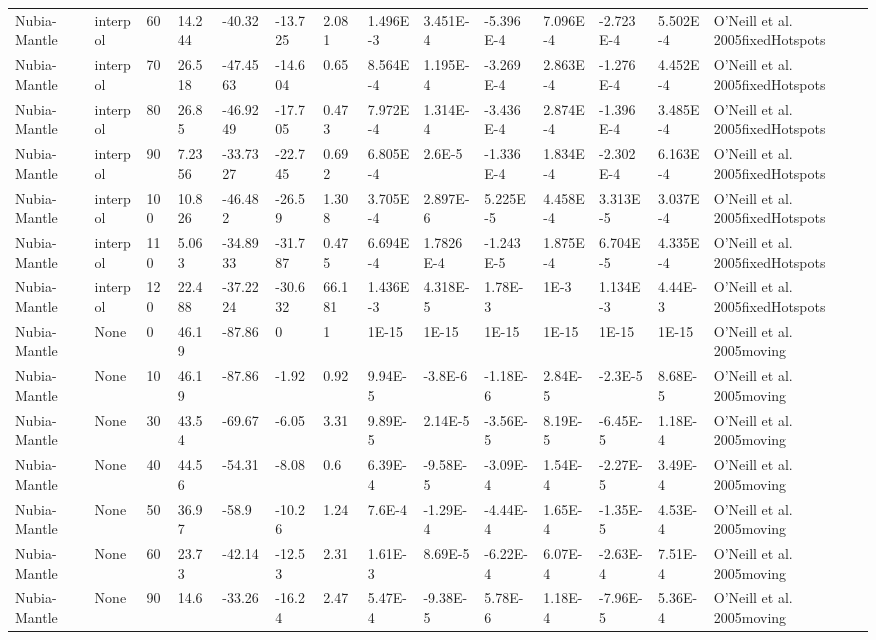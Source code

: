 \begin{landscape}
\begin{longtable}{@{}lllllllllllll>{\scriptsize}p{3.1cm}@{}}
Nubia-Mantle & interpol & 60 & 14.244 & -40.32 & -13.725 & 2.081 & 1.496E-3 & 3.451E-4 & -5.396E-4 & 7.096E-4 & -2.723E-4 & 5.502E-4 & O'Neill et al. 2005fixedHotspots \\
Nubia-Mantle & interpol & 70 & 26.518 & -47.4563 & -14.604 & 0.65 & 8.564E-4 & 1.195E-4 & -3.269E-4 & 2.863E-4 & -1.276E-4 & 4.452E-4 & O'Neill et al. 2005fixedHotspots \\
Nubia-Mantle & interpol & 80 & 26.85 & -46.9249 & -17.705 & 0.473 & 7.972E-4 & 1.314E-4 & -3.436E-4 & 2.874E-4 & -1.396E-4 & 3.485E-4 & O'Neill et al. 2005fixedHotspots \\
Nubia-Mantle & interpol & 90 & 7.2356 & -33.7327 & -22.745 & 0.692 & 6.805E-4 & 2.6E-5 & -1.336E-4 & 1.834E-4 & -2.302E-4 & 6.163E-4 & O'Neill et al. 2005fixedHotspots \\
Nubia-Mantle & interpol & 100 & 10.826 & -46.482 & -26.59 & 1.308 & 3.705E-4 & 2.897E-6 & 5.225E-5 & 4.458E-4 & 3.313E-5 & 3.037E-4 & O'Neill et al. 2005fixedHotspots \\
Nubia-Mantle & interpol & 110 & 5.063 & -34.8933 & -31.787 & 0.475 & 6.694E-4 & 1.7826E-4 & -1.243E-5 & 1.875E-4 & 6.704E-5 & 4.335E-4 & O'Neill et al. 2005fixedHotspots \\
Nubia-Mantle & interpol & 120 & 22.488 & -37.2224 & -30.632 & 66.181 & 1.436E-3 & 4.318E-5 & 1.78E-3 & 1E-3 & 1.134E-3 & 4.44E-3 & O'Neill et al. 2005fixedHotspots \\
Nubia-Mantle & None & 0 & 46.19 & -87.86 & 0 & 1 & 1E-15 & 1E-15 & 1E-15 & 1E-15 & 1E-15 & 1E-15 & O'Neill et al. 2005moving \\
Nubia-Mantle & None & 10 & 46.19 & -87.86 & -1.92 & 0.92 & 9.94E-5 & -3.8E-6 & -1.18E-6 & 2.84E-5 & -2.3E-5 & 8.68E-5 & O'Neill et al. 2005moving \\
Nubia-Mantle & None & 30 & 43.54 & -69.67 & -6.05 & 3.31 & 9.89E-5 & 2.14E-5 & -3.56E-5 & 8.19E-5 & -6.45E-5 & 1.18E-4 & O'Neill et al. 2005moving \\
Nubia-Mantle & None & 40 & 44.56 & -54.31 & -8.08 & 0.6 & 6.39E-4 & -9.58E-5 & -3.09E-4 & 1.54E-4 & -2.27E-5 & 3.49E-4 & O'Neill et al. 2005moving \\
Nubia-Mantle & None & 50 & 36.97 & -58.9 & -10.26 & 1.24 & 7.6E-4 & -1.29E-4 & -4.44E-4 & 1.65E-4 & -1.35E-5 & 4.53E-4 & O'Neill et al. 2005moving \\
Nubia-Mantle & None & 60 & 23.73 & -42.14 & -12.53 & 2.31 & 1.61E-3 & 8.69E-5 & -6.22E-4 & 6.07E-4 & -2.63E-4 & 7.51E-4 & O'Neill et al. 2005moving \\
Nubia-Mantle & None & 90 & 14.6 & -33.26 & -16.24 & 2.47 & 5.47E-4 & -9.38E-5 & 5.78E-6 & 1.18E-4 & -7.96E-5 & 5.36E-4 & O'Neill et al. 2005moving \\

\end{longtable}
\end{landscape}
